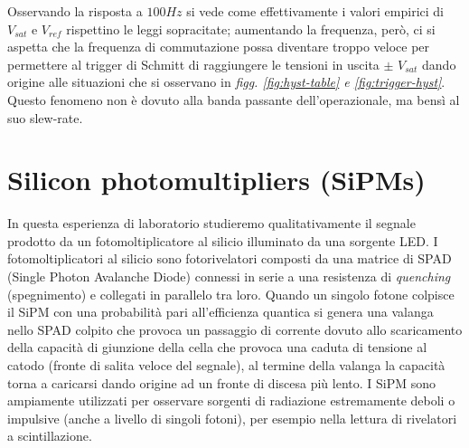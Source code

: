 \documentclass[journal]{IEEEtran}
\begin{document}
Osservando la risposta a $100 Hz$ si vede come effettivamente i valori empirici di $V_{sat}$ e $V_{ref}$ rispettino le leggi sopracitate; aumentando la frequenza, però, ci si aspetta che la frequenza di commutazione possa diventare troppo veloce per permettere al trigger di Schmitt di raggiungere le tensioni in uscita $\pm$ $V_{sat}$ dando origine alle situazioni che si osservano in \textit{figg. \ref{fig:hyst-table} e \ref{fig:trigger-hyst}}. Questo fenomeno non è dovuto alla banda passante dell'operazionale, ma bensì al suo slew-rate.



\section{\textbf{Silicon photomultipliers (SiPMs)}} %
In questa esperienza di laboratorio studieremo qualitativamente il segnale prodotto da un fotomoltiplicatore al silicio illuminato da una sorgente LED. I fotomoltiplicatori al silicio sono fotorivelatori composti da una matrice di SPAD (Single Photon Avalanche Diode) connessi in serie a una resistenza di \textit{quenching} (spegnimento) e collegati in parallelo tra loro. Quando un singolo fotone colpisce il SiPM con una probabilità pari all'efficienza quantica si genera una valanga nello SPAD colpito che provoca un passaggio di corrente dovuto allo scaricamento della capacità di giunzione della cella che provoca una caduta di tensione al catodo (fronte di salita veloce del segnale), al termine della valanga la capacità torna a caricarsi dando origine ad un fronte di discesa più lento. I SiPM sono ampiamente utilizzati per osservare sorgenti di radiazione estremamente deboli o impulsive (anche a livello di singoli fotoni), per esempio nella lettura di rivelatori a scintillazione.
\end{document}
